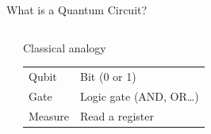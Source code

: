 \documentclass[aspectratio=169,10pt]{beamer}
\begin{document}
\begin{frame}{What is a Quantum Circuit?}
\begin{columns}[T]
\begin{center}
      \end{center}
      \vspace{6pt}
      \begin{block}{\small Classical analogy}
        \scriptsize
        \begin{tabular}{@{}ll@{}}
          Qubit     & Bit (0 or 1) \\
          Gate      & Logic gate (AND, OR\ldots) \\
          Measure   & Read a register \\
        \end{tabular}
      \end{block}
  \end{columns}
\end{frame}
\end{document}
